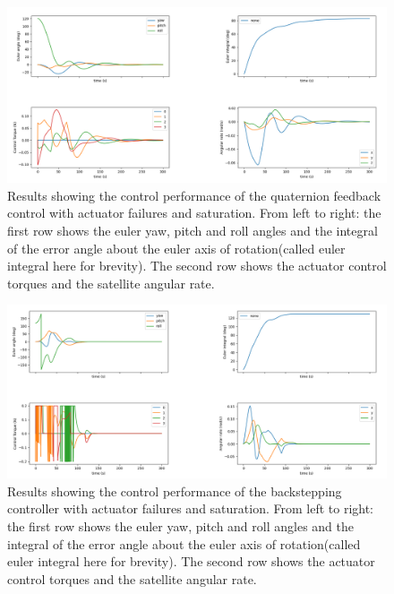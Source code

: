 \begin{figure}
    \centering
    \includegraphics[width=\textwidth]{Y1-report/Results-q_feedback.png}
    \caption{Results showing the control performance of the quaternion feedback control with actuator failures and saturation. From left to right: the first row shows the euler yaw, pitch and roll angles and the integral of the error angle about the euler axis of rotation(called euler integral here for brevity). The second row shows the actuator control torques and the satellite angular rate.}
    \label{fig:q_feedback-results}
\end{figure}
\begin{figure}
    \centering
    \includegraphics[width=\textwidth]{Y1-report/Results-backstepping_shen.png}
    \caption{Results showing the control performance of the backstepping controller with actuator failures and saturation. From left to right: the first row shows the euler yaw, pitch and roll angles and the integral of the error angle about the euler axis of rotation(called euler integral here for brevity). The second row shows the actuator control torques and the satellite angular rate.}
    \label{fig:backstepping-results}
\end{figure}

